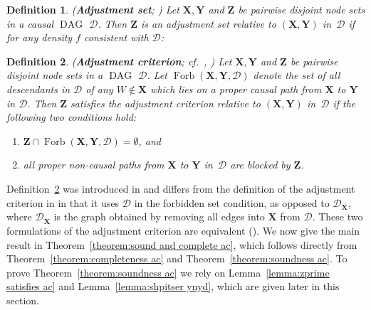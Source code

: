 \documentclass[11pt,a4paper]{article}
\makeatletter
\newtheorem{definition}{Definition}
\DeclareMathOperator{\DAG}{DAG}
\DeclareMathOperator{\Forbi}{Forb}
\newcommand{\forb}{the forbidden set condition\xspace}
\newcommand{\g}[1][G]{\mathcal{#1}}
\newcommand{\fb}[2][X,Y]{\Forbi(\mathbf{#1},#2)}%
\def\ccctext#1{\expandafter\@ccctext\csname c@#1\endcsname}
\def\@ccctext#1{\ifcase#1\or \textbf{Forbidden set}\or \textbf{Blocking}\fi}
\makeatother
\begin{document}
\begin{definition}{(\textbf{Adjustment set}; \citealp[Chapter~3.3.1]{Pearl2009})}
  Let $\mathbf{X,Y}$ and $\mathbf{Z}$ be pairwise disjoint node sets in a causal $\DAG$ $\g[D]$. Then $\mathbf{Z}$ is an adjustment set relative to $(\mathbf{X,Y})$ in~$\g[D]$ if for any density $f$ consistent with $\g[D]$:
   \begin{center}
  \end{center}
   \label{def:pearl adjustment}
\end{definition}

\begin{definition} (\textbf{Adjustment criterion}; cf.~\citealp{shpitser2012avalidity}, \citealp{vanconstructing})
Let $\mathbf{X,Y}$ and $\mathbf{Z}$ be pairwise disjoint node sets in a $\DAG$ $\g[D]$. Let $\fb{\g[D]}$ denote the set of all descendants in $\g[D]$ of any $W \notin \mathbf{X}$ which lies on a proper causal path from $\mathbf{X}$ to $\mathbf{Y}$ in $\g[D]$. Then $\mathbf{Z}$ satisfies the adjustment criterion relative to $(\mathbf{X,Y})$ in~$\g[D]$ if the following two conditions hold:
\begin{enumerate}[label = (\ccctext*), leftmargin=0.5cm,align=left]
\item\label{d:acoriginal1} $\mathbf{Z} \cap \fb{\g[D]} = \emptyset$, and
\item\label{d:acoriginal2} all proper non-causal paths from $\mathbf{X}$ to $\mathbf{Y}$ in~$\g[D]$ are blocked by $\mathbf{Z}$.
\end{enumerate}
\label{def:johannes ac shpitser}
\end{definition}

Definition~\ref{def:johannes ac shpitser} was introduced in \citet{vanconstructing} and differs from the definition of the adjustment criterion in \citet{shpitser2012avalidity} in that it uses $\g[D]$ in \forb{}, as opposed to $\g[D]_{\overline{\mathbf{X}}}$, where $\g[D]_{\overline{\mathbf{X}}}$ is the graph obtained by removing all edges into $\mathbf{X}$ from $\g[D]$. These two formulations of the adjustment criterion are equivalent (\citealp[Remark~4.3~in][]{vanconstructing}). We now give the main result in Theorem~\ref{theorem:sound and complete ac}, which follows directly from Theorem~\ref{theorem:completeness ac} and Theorem~\ref{theorem:soundness ac}. To prove Theorem~\ref{theorem:soundness ac} we rely on Lemma~\ref{lemma:zprime satisfies ac} and Lemma~\ref{lemma:shpitser ynyd}, which are given later in this section.
\end{document}
